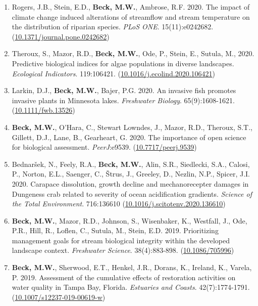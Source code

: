 \documentclass[letterpaper,12pt]{article}
\begin{document}
\begin{enumerate}
\item Rogers, J.B., Stein, E.D., \textbf{Beck, M.W.}, Ambrose, R.F. 2020. The impact of climate change induced alterations of streamflow and stream temperature on the distribution of riparian species. \textit{PLoS ONE}. 15(11):e0242682. ({\footnotesize\href{https://doi.org/10.1371/journal.pone.0242682}{10.1371/journal.pone.0242682}})

\item Theroux, S., Mazor, R.D., \textbf{Beck, M.W.}, Ode, P., Stein, E., Sutula, M., 2020. Predictive biological indices for algae populations in diverse landscapes. \textit{Ecological Indicators}. 119:106421. ({\footnotesize\href{https://doi.org/10.1016/j.ecolind.2020.106421}{10.1016/j.ecolind.2020.106421}})

\item Larkin, D.J., \textbf{Beck, M.W.}, Bajer, P.G. 2020. An invasive fish promotes invasive plants in Minnesota lakes. \textit{Freshwater Biology}. 65(9):1608-1621. ({\footnotesize\href{https://doi.org/10.1111/fwb.13526}{10.1111/fwb.13526}})

\item \textbf{Beck, M.W.}, O'Hara, C., Stewart Lowndes, J., Mazor, R.D., Theroux, S.T., Gillett, D.J., Lane, B., Gearheart, G. 2020. The importance of open science for biological assessment. \textit{PeerJ}:e9539. ({\footnotesize\href{https://doi.org/10.7717/peerj.9539}{10.7717/peerj.9539}})

\item Bednar\v{s}ek, N., Feely, R.A., \textbf{Beck, M.W.}, Alin, S.R., Siedlecki, S.A., Calosi, P., Norton, E.L., Saenger, C., \v{S}trus, J., Greeley, D., Nezlin, N.P., Spicer, J.I. 2020. Carapace dissolution, growth decline and mechanorecepter damages in {D}ungeness crab related to severity of ocean acidification gradients. \textit{Science of the Total Environment}. 716:136610 ({\footnotesize\href{https://doi.org/10.1016/j.scitotenv.2020.136610}{10.1016/j.scitotenv.2020.136610}})

\item \textbf{Beck, M.W.}, Mazor, R.D., Johnson, S., Wisenbaker, K., Westfall, J., Ode, P.R., Hill, R., Loflen, C., Sutula, M., Stein, E.D. 2019. Prioritizing management goals for stream biological integrity within the developed landscape context. \textit{Freshwater Science}. 38(4):883-898. ({\footnotesize\href{https://doi.org/10.1086/705996}{10.1086/705996}})

\item \textbf{Beck, M.W.}, Sherwood, E.T., Henkel, J.R., Dorans, K., Ireland, K., Varela, P. 2019. Assessment of the cumulative effects of restoration activities on water quality in Tampa Bay, Florida. \textit{Estuaries and Coasts}. 42(7):1774-1791. ({\footnotesize\href{https://doi.org/10.1007/s12237-019-00619-w}{10.1007/s12237-019-00619-w}})


\end{enumerate}
\end{document}
